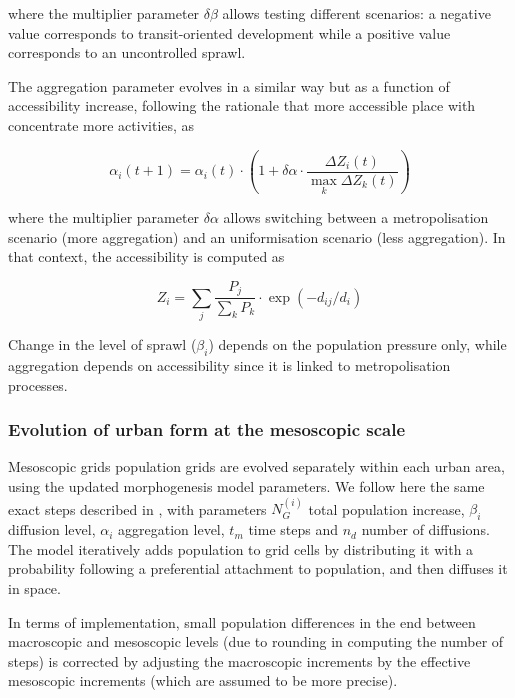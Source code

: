 \documentclass[referee,lineno,pdflatex,sn-apa]{sn-jnl}
\begin{document}
where the multiplier parameter $\delta\beta$ allows testing different scenarios: a negative value corresponds to transit-oriented development while a positive value corresponds to an uncontrolled sprawl.
			
The aggregation parameter evolves in a similar way but as a function of accessibility increase, following the rationale that more accessible place with concentrate more activities, as
 
\begin{equation}
	\label{eq:eq5}
	\alpha_i (t+1) = \alpha_i (t) \cdot \left(1 + \delta\alpha \cdot \frac{\Delta Z_i (t)}{\max_k  \Delta Z_k (t)}\right)
\end{equation}
			
where the multiplier parameter $\delta\alpha$ allows switching between a metropolisation scenario (more aggregation) and an uniformisation scenario (less aggregation). In that context, the accessibility is computed as
			
\begin{equation}
	\label{eq:eq6}
	Z_i = \sum_j \frac{P_j}{\sum_k P_k} \cdot \exp( - d_{ij} / d_i)
\end{equation}
			
Change in the level of sprawl ($\beta_i$) depends on the population pressure only, while aggregation depends on accessibility since it is linked to metropolisation processes.




\subsubsection{Evolution of urban form at the mesoscopic scale}
	
Mesoscopic grids population grids are evolved separately within each urban area, using the updated morphogenesis model parameters. We follow here the same exact steps described in \cite{raimbault2018calibration}, with parameters $N_G^{(i)}$ total population increase, $\beta_i$ diffusion level, $\alpha_i$ aggregation level, $t_m$ time steps and $n_d$ number of diffusions. The model iteratively adds population to grid cells by distributing it with a probability following a preferential attachment to population, and then diffuses it in space.

In terms of implementation, small population differences in the end between macroscopic and mesoscopic levels (due to rounding in computing the number of steps) is corrected by adjusting the macroscopic increments by the effective mesoscopic increments (which are assumed to be more precise).
	
\end{document}
